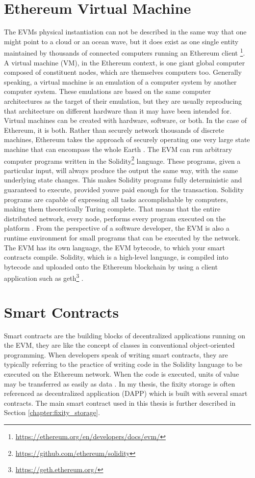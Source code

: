 \section{Ethereum Virtual Machine}
The EVMs physical instantiation can not be described in the same way that one might point to a cloud or an ocean wave, but it does exist as one single entity maintained by thousands of connected computers running an Ethereum client \footnote{\url{https://ethereum.org/en/developers/docs/evm/}}.
A virtual machine (VM), in the Ethereum context, is one giant global computer composed of constituent nodes, which are themselves computers too. Generally speaking, a virtual machine is an emulation of a computer system by another computer system. These emulations are based on the same computer architectures as the target of their emulation, but they are usually reproducing that architecture on different hardware than it may have been intended for. Virtual machines can be created with hardware, software, or both. In the case of Ethereum, it is both. Rather than securely network thousands of discrete machines, Ethereum takes the approach of securely operating one very large state machine that can encompass the whole Earth \cite[48]{dannen2017introducing}.
The EVM can run arbitrary computer programs written in the Solidity\footnote{\url{https://github.com/ethereum/solidity}} language. These programs, given a particular input, will always produce the output the same way, with the same underlying state changes. This makes Solidity programs fully deterministic and guaranteed to execute, provided youve paid enough for the transaction. Solidity programs are capable of expressing all tasks accomplishable by computers, making them theoretically Turing complete. That means that the entire distributed network, every node, performs every program executed on the platform \cite[50]{dannen2017introducing}. 
From the perspective of a software developer, the EVM is also a runtime environment for small programs that can be executed by the network. The EVM has its own language, the EVM bytecode, to which your smart contracts compile. Solidity, which is a high-level language, is compiled into bytecode and uploaded onto the Ethereum blockchain by using a client application such as geth\footnote{\url{https://geth.ethereum.org/}} \cite[51]{dannen2017introducing}.

\section{Smart Contracts}
Smart contracts are the building blocks of decentralized applications running on the EVM, they are like the concept of classes in conventional object-oriented programming. When developers speak of writing smart contracts, they are typically referring to the practice of writing code in the Solidity language to be executed on the Ethereum network. When the code is executed, units of value may be transferred as easily as data \cite[10]{dannen2017introducing}.
In my thesis, the fixity storage is often referenced as decentralized application (DAPP) which is built with several smart contracts. The main smart contract used in this thesis is further described in Section \ref{chapter:fixity_storage}. 

